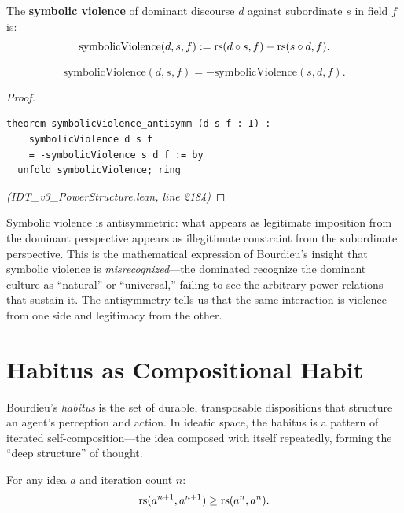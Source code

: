 \begin{definition}
\label{def:symbolic-violence}
The \textbf{symbolic violence} of dominant discourse $d$ against subordinate $s$
in field $f$ is:
\[
  \mathrm{symbolicViolence}(d, s, f) := \mathrm{rs}(d \circ s, f) - \mathrm{rs}(s \circ d, f).
\]
\end{definition}

\begin{theorem}
\label{thm:symbolic-violence-antisymm}
\[
  \mathrm{symbolicViolence}(d, s, f) = -\mathrm{symbolicViolence}(s, d, f).
\]
\end{theorem}

\begin{proof}
\begin{lstlisting}
theorem symbolicViolence_antisymm (d s f : I) :
    symbolicViolence d s f
    = -symbolicViolence s d f := by
  unfold symbolicViolence; ring
\end{lstlisting}
\textit{(IDT\_v3\_PowerStructure.lean, line 2184)}
\end{proof}

\begin{interpretation}
Symbolic violence is antisymmetric: what appears as legitimate imposition from
the dominant perspective appears as illegitimate constraint from the subordinate
perspective. This is the mathematical expression of Bourdieu's insight that
symbolic violence is \emph{misrecognized}---the dominated recognize the dominant
culture as ``natural'' or ``universal,'' failing to see the arbitrary power
relations that sustain it. The antisymmetry tells us that the same interaction
is violence from one side and legitimacy from the other.
\end{interpretation}

\section{Habitus as Compositional Habit}

Bourdieu's \emph{habitus} is the set of durable, transposable dispositions that
structure an agent's perception and action. In ideatic space, the habitus is a
pattern of iterated self-composition---the idea composed with itself repeatedly,
forming the ``deep structure'' of thought.

\begin{theorem}
\label{thm:habitus-accumulation}
For any idea $a$ and iteration count $n$:
\[
  \mathrm{rs}(a^{n+1}, a^{n+1}) \geq \mathrm{rs}(a^n, a^n).
\]
\end{theorem}

